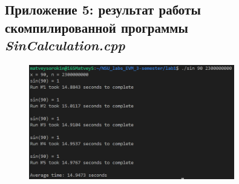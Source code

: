 \documentclass[12pt,a4paper]{article}
\numberwithin{subsection}{section}
\begin{document}
\vspace{1cm}


\subsection*{Приложение 5: результат работы скомпилированной программы 
\textit{SinCalculation.cpp}}

\begin{figure}[H]
    \includegraphics[width=0.8\textwidth]{5.png}
\end{figure}
\end{document}

